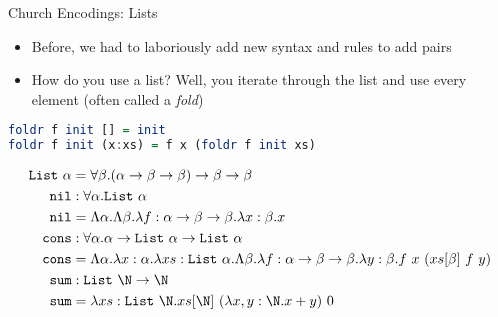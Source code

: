 \documentclass[leqno,presentation,usenames,dvipsnames]{beamer}
\begin{document}
\begin{frame}[fragile]{Church Encodings: Lists}
    \begin{itemize}
        \item Before, we had to laboriously add new syntax and rules to add pairs
        \item How do you use a list? Well, you iterate through the list and use every element (often called a \emph{fold})
    \end{itemize}

\begin{lstlisting}[language=haskell, basicstyle=\small\ttfamily]
foldr f init [] = init
foldr f init (x:xs) = f x (foldr f init xs)
\end{lstlisting}

    \small
    \begin{align*}
        \texttt{List}~\alpha & = \forall \beta. (\alpha \to \beta \to \beta) \to \beta \to \beta \\
        \texttt{nil} & : \forall \alpha. \texttt{List}~\alpha \\
        \texttt{nil} & = \Lambda \alpha. \Lambda \beta. \lambda f : \alpha \to \beta \to \beta. \lambda x : \beta . x \\
        \texttt{cons} & : \forall \alpha. \alpha \to \texttt{List}~\alpha \to \texttt{List}~\alpha \\
        \texttt{cons} & = \Lambda \alpha. \lambda x : \alpha. \lambda xs : \texttt{List}~\alpha . \Lambda \beta. \lambda f : \alpha \to \beta \to \beta . \lambda y : \beta . f~x~(xs[\beta]~f~y) \\
        \texttt{sum} & : \texttt{List}~\N \to \N \\
        \texttt{sum} & = \lambda xs : \texttt{List}~\N . xs[\N]~(\lambda x, y : \N. x + y)~0
    \end{align*}
\end{frame}
\end{document}
